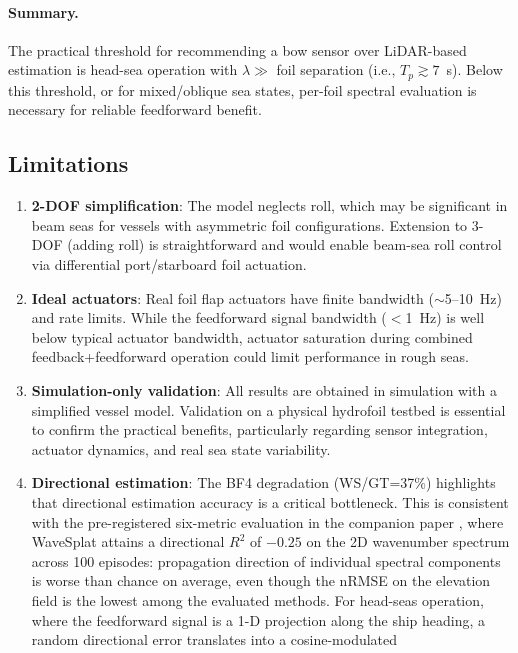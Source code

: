 \documentclass[review]{elsarticle}
\begin{document}
\paragraph{Summary.}
The practical threshold for recommending a bow sensor over LiDAR-based
estimation is head-sea operation with $\lambda \gg$ foil separation
(i.e., $T_p \gtrsim 7$~s).  Below this threshold, or for mixed/oblique
sea states, per-foil spectral evaluation is necessary for reliable
feedforward benefit.

\subsection{Limitations}

\begin{enumerate}
  \item \textbf{2-DOF simplification}: The model neglects roll,
    which may be significant in beam seas for vessels with
    asymmetric foil configurations.  Extension to 3-DOF (adding roll)
    is straightforward and would enable beam-sea roll control via
    differential port/starboard foil actuation.
  \item \textbf{Ideal actuators}: Real foil flap actuators have finite
    bandwidth ($\sim$5--10~Hz) and rate limits.
    While the feedforward signal bandwidth ($<$1~Hz) is well below
    typical actuator bandwidth, actuator saturation during combined
    feedback+feedforward operation could limit performance in rough seas.
  \item \textbf{Simulation-only validation}: All results are obtained
    in simulation with a simplified vessel model.  Validation on a
    physical hydrofoil testbed is essential to confirm the practical
    benefits, particularly regarding sensor integration, actuator
    dynamics, and real sea state variability.
  \item \textbf{Directional estimation}: The BF4 degradation (WS/GT=37\%)
    highlights that directional estimation accuracy is a critical
    bottleneck.  This is consistent with the pre-registered six-metric
    evaluation in the companion paper \citep{park2026wavesplat}, where
    WaveSplat attains a directional $R^2$ of $-0.25$ on the 2D
    wavenumber spectrum across 100 episodes: propagation direction
    of individual spectral components is worse than chance on average,
    even though the nRMSE on the elevation field is the lowest among
    the evaluated methods.  For head-seas operation, where the
    feedforward signal is a 1-D projection along the ship heading,
    a random directional error translates into a cosine-modulated

\end{enumerate}
\end{document}
